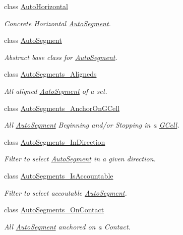 \begin{DoxyCompactItemize}
class \hyperlink{classKatabatic_1_1AutoHorizontal}{Auto\+Horizontal}
\begin{DoxyCompactList}\small\item\em Concrete Horizontal \hyperlink{classKatabatic_1_1AutoSegment}{Auto\+Segment}. \end{DoxyCompactList}\item 
class \hyperlink{classKatabatic_1_1AutoSegment}{Auto\+Segment}
\begin{DoxyCompactList}\small\item\em Abstract base class for \hyperlink{classKatabatic_1_1AutoSegment}{Auto\+Segment}. \end{DoxyCompactList}\item 
class \hyperlink{classKatabatic_1_1AutoSegments__Aligneds}{Auto\+Segments\+\_\+\+Aligneds}
\begin{DoxyCompactList}\small\item\em All aligned \hyperlink{classKatabatic_1_1AutoSegment}{Auto\+Segment} of a set. \end{DoxyCompactList}\item 
class \hyperlink{classKatabatic_1_1AutoSegments__AnchorOnGCell}{Auto\+Segments\+\_\+\+Anchor\+On\+G\+Cell}
\begin{DoxyCompactList}\small\item\em All \hyperlink{classKatabatic_1_1AutoSegment}{Auto\+Segment} Beginning and/or Stopping in a \hyperlink{classKatabatic_1_1GCell}{G\+Cell}. \end{DoxyCompactList}\item 
class \hyperlink{classKatabatic_1_1AutoSegments__InDirection}{Auto\+Segments\+\_\+\+In\+Direction}
\begin{DoxyCompactList}\small\item\em Filter to select \hyperlink{classKatabatic_1_1AutoSegment}{Auto\+Segment} in a given direction. \end{DoxyCompactList}\item 
class \hyperlink{classKatabatic_1_1AutoSegments__IsAccountable}{Auto\+Segments\+\_\+\+Is\+Accountable}
\begin{DoxyCompactList}\small\item\em Filter to select accoutable \hyperlink{classKatabatic_1_1AutoSegment}{Auto\+Segment}. \end{DoxyCompactList}\item 
class \hyperlink{classKatabatic_1_1AutoSegments__OnContact}{Auto\+Segments\+\_\+\+On\+Contact}
\begin{DoxyCompactList}\small\item\em All \hyperlink{classKatabatic_1_1AutoSegment}{Auto\+Segment} anchored on a Contact. \end{DoxyCompactList}\item 

\end{DoxyCompactItemize}
